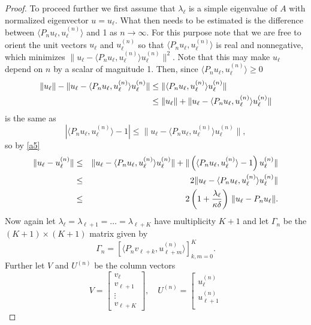 \documentclass[final]{siamltex}
\numberwithin{equation}{section}
\begin{document}
\begin{proof}
To proceed further we first assume that $\lambda_{\ell}$ is a simple eigenvalue of $A$ with normalized eigenvector $u=u_{\ell}$. What then needs to be estimated is the difference between $\langle P_n u_{\ell},u_{\ell}^{(n)} \rangle$ and 1 as $n\to \infty$. For this purpose note that we are free to orient the unit vectors
$u_{\ell}$ and $u_{\ell}^{(n)}$ so that $\langle P_n u_{\ell},u_{\ell}^{(n)} \rangle$ is real and nonnegative, which minimizes $\|u_{\ell} - \langle P_n u_{\ell},u_{\ell}^{(n)} \rangle u_{\ell}^{(n)} \|^2$. Note that this may make $u_{\ell}$ depend on $n$ by a scalar of magnitude 1. Then, since $\langle P_n u_{\ell},u_{\ell}^{(n)} \rangle\ge 0$
\begin{align}
\|u_{\ell}\|- \|u_{\ell}- \langle P_n u_{\ell}, u_{\ell}^{(n)}\rangle
u_{\ell}^{(n)}\| &\le \|\langle P_n u_{\ell}, u_{\ell}^{(n)}\rangle
u_{\ell}^{(n)}\| \notag \\
&\le \|u_{\ell}\| + \|u_{\ell}- \langle P_n u_{\ell}, u_{\ell}^{(n)}\rangle
u_{\ell}^{(n)}\| \label{a6}
\end{align}
is the same as
\[|\langle P_n u_{\ell}, u_{\ell}^{(n)}\rangle-1| \le \|u_{\ell}- \langle P_n u_{\ell}, u_{\ell}^{(n)}\rangle
u_{\ell}^{(n)}\|,
\]
so by \eqref{a5}
\begin{eqnarray}
\|u_{\ell}-u_{\ell}^{(n)}\|&\le& \|u_{\ell}- \langle P_n u_{\ell}, u_{\ell}^{(n)}\rangle
u_{\ell}^{(n)}\|+ \|\left(\langle P_n u_{\ell}, u_{\ell}^{(n)}\rangle-1\right) u_{\ell}^{(n)} \| \notag \\
&\le& 2  \|u_{\ell}- \langle P_n u_{\ell}, u_{\ell}^{(n)}\rangle
u_{\ell}^{(n)}\| \notag \\
&\le& 2 \left(1+ \frac{\lambda_{\ell}}{\kappa \delta}\right) \, \|u_{\ell} - P_n
u_{\ell}\|. \label{a7}
\end{eqnarray}
Now again let  $\lambda_{\ell}=\lambda_{\ell+1}=\ldots = \lambda_{\ell+K}$ have multiplicity $K+1$ and let $\Gamma_n$ be the $(K+1) \times (K+1)$ matrix given by
\[\Gamma_n=
\left[\langle P_n v_{\ell+k}, u_{\ell+m}^{(n)} \rangle\right]_{k,m=0}^{K}.\]
Further let $V$ and $U^{(n)}$ be the column vectors
\[V=\left[
\begin{array}{c}
v_{\ell}\\
v_{\ell+1}\\
\vdots \\
v_{\ell+K}
\end{array}\right], \quad
U^{(n)}=\left[
\begin{array}{c}
u_{\ell}^{(n)}\\
u_{\ell+1}^{(n)}\\

\end{array}\]
\end{proof}
\end{document}
